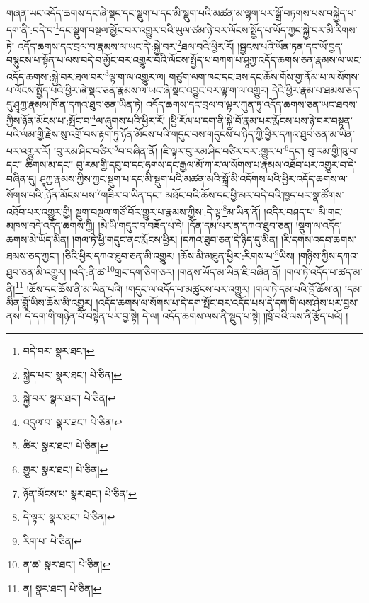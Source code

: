གཞན་ཡང་འདོད་ཆགས་དང་ཞེ་སྡང་དང་སྡུག་པ་དང་མི་སྡུག་པའི་མཚན་མ་ལྷག་པར་སྒྲོ་བཏགས་པས་བསྐྱེད་པ་དག་ནི་:བདེ་བ་\footnote{བདེ་བར་  སྣར་ཐང་། }དང་སྡུག་བསྔལ་མྱོང་བར་འགྱུར་བའི་ཡུལ་ཙམ་ཉེ་བར་ལོངས་སྤྱོད་པ་ཡོད་ཀྱང་སྐྱེ་བར་མི་རིགས་ཏེ། འདོད་ཆགས་དང་བྲལ་བ་རྣམས་ལ་ཡང་དེ་:སྐྱེ་བར་\footnote{སྐྱེད་པར་  སྣར་ཐང་།  པེ་ཅིན། }ཐལ་བའི་ཕྱིར་རོ། །སྦྱངས་པའི་ཡོན་ཏན་དང་ཡོ་བྱད་བསྙུངས་པ་སྟོན་པ་ལས་བདེ་བ་མྱོང་བར་འགྱུར་བའི་ལོངས་སྤྱོད་པ་བཀག་པ་ཤཱཀྱ་འདོད་ཆགས་ཅན་རྣམས་ལ་ཡང་འདོད་ཆགས་:སྐྱེ་བར་ཐལ་བར་\footnote{སྐྱེ་བར་  སྣར་ཐང་།  པེ་ཅིན། }ལྟ་ག་ལ་འགྱུར་ལ། གཙུག་ལག་ཁང་དང་ཟས་དང་ཆོས་གོས་གྱ་ནོམ་པ་ལ་སོགས་པ་ལོངས་སྤྱོད་པའི་ཕྱིར་ཞེ་སྡང་ཅན་རྣམས་ལ་ཡང་ཞེ་སྡང་འབྱུང་བར་ལྟ་ག་ལ་འགྱུར། དེའི་ཕྱིར་རྣམ་པ་ཐམས་ཅད་དུ་ཤཱཀྱ་རྣམས་ཁོ་ན་དཀའ་ཐུབ་ཅན་ཡིན་ཏེ། འདོད་ཆགས་དང་བྲལ་བ་ལྟར་ཀུན་ཏུ་འདོད་ཆགས་ཅན་ཡང་ཐབས་ཀྱིས་ཉོན་མོངས་པ་:སྤོང་བ་\footnote{འདུལ་བ་  སྣར་ཐང་།  པེ་ཅིན། }ལ་ཞུགས་པའི་ཕྱིར་རོ། །ཕྱི་རོལ་པ་དག་ནི་སྐྱེ་བོ་རྣམ་པར་རྨོངས་པས་ཉེ་བར་བསྟན་པའི་ལམ་གྱི་རྗེས་སུ་འགྲོ་བས་རྟག་ཏུ་ཉོན་མོངས་པའི་གདུང་བས་གདུངས་པ་ཉིད་ཀྱི་ཕྱིར་དཀའ་ཐུབ་ཅན་མ་ཡིན་པར་འགྱུར་རོ། །བུ་རམ་ཤིང་བཙིར་\footnote{ཚིར་  སྣར་ཐང་།  པེ་ཅིན། }བ་བཞིན་ནོ། །ཇི་ལྟར་བུ་རམ་ཤིང་བཙིར་བར་:གྱུར་པ་\footnote{གྱུར་  སྣར་ཐང་།  པེ་ཅིན། }དང་། བུ་རམ་གྱི་ཁུ་བ་དང་། ཚིགས་མ་དང་། བུ་རམ་གྱི་དབུ་བ་དང་ཧྭགས་དང་རྒྱལ་མོ་ཀ་ར་ལ་སོགས་པ་རྣམས་འཐོབ་པར་འགྱུར་བ་དེ་བཞིན་དུ། ཤཱཀྱ་རྣམས་ཀྱིས་ཀྱང་སྡུག་པ་དང་མི་སྡུག་པའི་མཚན་མའི་སྒྲོ་མི་འདོགས་པའི་ཕྱིར་འདོད་ཆགས་ལ་སོགས་པའི་:ཉོན་མོངས་པས་\footnote{ཉོན་མོངས་པ་  སྣར་ཐང་།  པེ་ཅིན། }གཟིར་བ་ཡིན་དང་། མཐོང་བའི་ཆོས་དང་ཕྱི་མར་བདེ་བའི་ཁྱད་པར་སྣ་ཚོགས་འཐོབ་པར་འགྱུར་གྱི། སྡུག་བསྔལ་གཙོ་བོར་གྱུར་པ་རྣམས་ཀྱིས་:དེ་ལྟ་\footnote{དེ་ལྟར་  སྣར་ཐང་།  པེ་ཅིན། }མ་ཡིན་ནོ། །འདིར་བཤད་པ། མི་གང་མཁས་བདེ་འདོད་ཆགས་ཀྱི། །མེ་ཡི་གདུང་བ་བཟོད་པ་དེ། །དོན་དམ་པར་ན་དཀའ་ཐུབ་ཅན། །སྡུག་ལ་འདོད་ཆགས་མེ་ཡོད་མིན། །གལ་ཏེ་ཕྱི་གདུང་ནང་རྨོངས་ཕྱིར། །དཀའ་ཐུབ་ཅན་དེ་ཉིད་དུ་མིན། །རི་དགས་འདབ་ཆགས་ཐམས་ཅད་ཀྱང་། །ཅིའི་ཕྱིར་དཀའ་ཐུབ་ཅན་མི་འགྱུར། །ཆོས་མི་མཐུན་ཕྱིར་:རིགས་པ་\footnote{རིག་པ་  པེ་ཅིན། }ཡིས། །གཉིས་ཀྱིས་དཀའ་ཐུབ་ཅན་མི་འགྱུར། །འདི་:ནི་ཚ་\footnote{ན་ཚ་  སྣར་ཐང་།  པེ་ཅིན། }གྲང་དག་ཅིག་ཅར། །གནས་ཡོད་མ་ཡིན་ཇི་བཞིན་ནོ། །གལ་ཏེ་འདོད་པ་ཚད་མ་ནི།\footnote{ན།  སྣར་ཐང་།  པེ་ཅིན། } །ཆོས་དང་ཆོས་ནི་མ་ཡིན་པའི། །གདུང་ལ་འདོད་པ་མཚུངས་པར་འགྱུར། །གལ་ཏེ་དམ་པའི་བློ་ཆོས་ན། །དམ་མིན་བློ་ཡིས་ཆོས་མི་འགྱུར། །འདོད་ཆགས་ལ་སོགས་པ་དེ་དག་སྤོང་བར་འདོད་པས་དེ་དག་གི་ལས་ཤེས་པར་བྱས་ནས། དེ་དག་གི་གཉེན་པོ་བསྟེན་པར་བྱ་སྟེ། དེ་ལ། འདོད་ཆགས་ལས་ནི་སྡུད་པ་སྟེ། །ཁྲོ་བའི་ལས་ནི་རྩོད་པའོ། །
